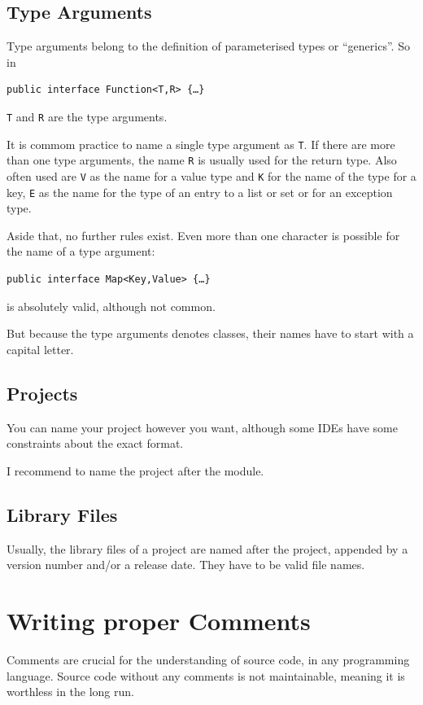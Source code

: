 \documentclass[11pt,a4paper, titlepage, parskip=half, headsepline, footsepline, cleardoublepage=current, headheight=1cm]{scrbook}
\begin{document}
\section{Type Arguments}\label{sec:TypeVariables}
Type arguments belong to the definition of parameterised types \autocite{ORACLE_DOC_LANGUAGE_SPECIFICATION:ParameterizedTypes} or “generics”. So in
\begin{lstlisting}
public interface Function<T,R> {…}
\end{lstlisting}
\lstinline|T| and \lstinline|R| are the type arguments.

It is commom practice to name a single type argument as \lstinline|T|. If there are more than one type arguments, the name \lstinline|R| is usually used for the return type. Also often used are \lstinline|V| as the name for a value type and \lstinline|K| for the name of the type for a key, \lstinline|E| as the name for the type of an entry to a list or set or for an exception type.

Aside that, no further rules exist. Even more than one character is possible for the name of a type argument: \begin{lstlisting}
public interface Map<Key,Value> {…}
\end{lstlisting}
is absolutely valid, although not common. 

But because the type arguments denotes classes, their names have to start with a capital letter.

\section{Projects}\label{sec:Projects}
You can name your project however you want, although some IDEs have some constraints about the exact format.

I recommend to name the project after the module.

\section{Library Files}\label{sec:LibraryFiles}
Usually, the library files of a project are named after the project, appended by a version number and/or a release date. They have to be valid file names.

\chapter{Writing proper Comments}\label{sec:WritingProperComments}
Comments are crucial for the understanding of source code, in any programming language. Source code without any comments is not maintainable, meaning it is worthless in the long run.
\end{document}

